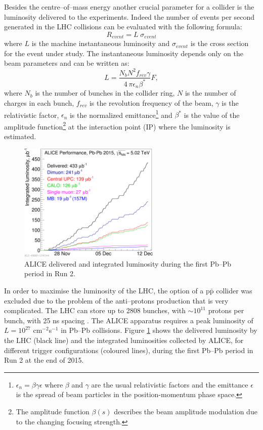 Besides the centre–of–mass energy another crucial parameter for a collider is the luminosity delivered 
to the experiments.
Indeed the number of events per second generated in the LHC collisions can be evaluated with the
following formula:
\begin{equation}
    R_{event} = L\;\sigma_{event}
\end{equation}
where $L$ is the machine instantaneous luminosity and $\sigma_{event}$ is the cross section for
the event under study. The instantaneous luminosity depends only on the beam parameters and can be 
written as:
\begin{equation}
    L = \frac{N_{b}N^{2} f_{rev} \gamma}{4\,\pi \epsilon_{n} \beta^{*}} F,
\end{equation}
where $N_{b}$ is the number of bunches in the collider ring, $N$ is the number of charges in each
bunch, $f_{rev}$ is the revolution frequency of the beam, $\gamma$ is the relativistic factor,
$\epsilon_{n}$ is the normalized emittance\footnote{$\epsilon_{n} = \beta \gamma \epsilon$ 
where $\beta$ and $\gamma$ are the usual relativistic factors and the emittance $\epsilon$ is the
spread of beam particles in the position-momentum phase space.} and $\beta^{*}$ is the value 
of the amplitude function\footnote{The amplitude function $\beta(s)$ describes the beam 
amplitude modulation due to the changing focusing strength.} at the interaction point (IP)
where the luminosity is estimated.

\begin{figure}
    \centering
    \includegraphics[width=0.6\textwidth]{gfx/alicelumi}
	\caption{ALICE delivered and integrated luminosity during the first Pb–Pb period in Run 2.}
	\label{fig:alicelumi}
\end{figure}

In order to maximise the luminosity of the LHC, the option of a p$\bar{\mathrm{p}}$ collider
was excluded due to the problem of the anti–protons production that is very complicated.
The LHC can store up to 2808 bunches, with $\sim 10^{11}$ protons per bunch, with 25 ns spacing
\cite{lhcperf}.
The ALICE apparatus requires a peak luminosity of $L = 10^{27}$ cm$^{-2}$s$^{-1}$ in Pb--Pb collisions.
Figure \ref{fig:alicelumi} shows the delivered luminosity by the LHC (black line) and the integrated
luminosities collected by ALICE, for different trigger configurations (coloured lines), during the
first Pb–Pb period in Run 2 at the end of 2015.

